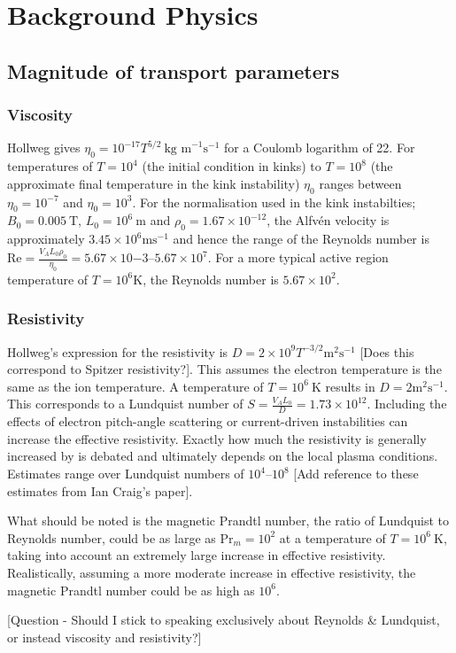 \chapter{Background Physics}

\section{Magnitude of transport parameters}

\subsection{Viscosity}

Hollweg gives $\eta_0 = 10^{-17} T^{5/2}\ \text{kg m}^{-1} \text{s}^{-1}$ for a Coulomb logarithm of 22. For temperatures of $T=10^4$ (the initial condition in kinks) to $T=10^8$ (the approximate final temperature in the kink instability) $\eta_0$ ranges between $\eta_0 = 10^{-7}$ and $\eta_0 = 10^3$. For the normalisation used in the kink instabilties; $B_0 = 0.005\ \text{T}$, $L_0 = 10^6\ \text{m}$ and $\rho_0 = 1.67 \times 10^{-12}$, the Alfv\'en velocity is approximately $3.45 \times 10^6 \text{ms}^{-1}$ and hence the range of the Reynolds number is $\text{Re} = \frac{V_A L_0 \rho_0}{\eta_0} = 5.67 \times 10{-3}$--$5.67 \times 10^{7}$. For a more typical active region temperature of $T=10^6 \text{K}$, the Reynolds number is $5.67 \times 10^2$. 

\subsection{Resistivity}

Hollweg's expression for the resistivity is $D = 2 \times 10^{9} T^{-3/2} \text{m}^2 \text{s}^{-1}$ [Does this correspond to Spitzer resistivity?]. This assumes the electron temperature is the same as the ion temperature. A temperature of $T=10^6\ \text{K}$ results in $D = 2 \text{m}^2 \text{s}^{-1}$. This corresponds to a Lundquist number of $S = \frac{V_A L_0}{D} = 1.73 \times 10^{12}$. Including the effects of electron pitch-angle scattering or current-driven instabilities can increase the effective resistivity. Exactly how much the resistivity is generally increased by is debated and ultimately depends on the local plasma conditions. Estimates range over Lundquist numbers of $10^{4}$--$10^{8}$ [Add reference to these estimates from Ian Craig's paper].

What should be noted is the magnetic Prandtl number, the ratio of Lundquist to Reynolds number, could be as large as $\text{Pr}_m = 10^2$ at a temperature of $T=10^6\ \text{K}$, taking into account an extremely large increase in effective resistivity. Realistically, assuming a more moderate increase in effective resistivity, the magnetic Prandtl number could be as high as $10^{6}$.

[Question - Should I stick to speaking exclusively about Reynolds \& Lundquist, or instead viscosity and resistivity?]
